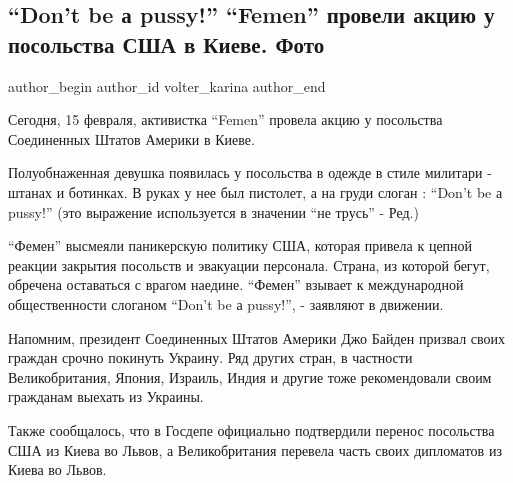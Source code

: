  
 
 
 
 
 
\subsection{\enquote{Don't be а pussy!} \enquote{Femen} провели акцию у посольства США в Киеве. Фото}
\label{sec:15_02_2022.stz.news.ua.strana.2.dont_be_a_pussy_akcia_femen}
 
\ifcmt
 author_begin
   author_id volter_karina
 author_end
\fi

Сегодня, 15 февраля, активистка \enquote{Femen} провела акцию у посольства Соединенных
Штатов Америки в Киеве.

Полуобнаженная девушка появилась у посольства в одежде в стиле милитари -
штанах и ботинках. В руках у нее был пистолет, а на груди слоган : \enquote{Don't be а
pussy!} (это выражение используется в значении \enquote{не трусь} - Ред.)


\enquote{Фемен} высмеяли паникерскую политику США, которая привела к цепной реакции
закрытия посольств и эвакуации персонала. Страна, из которой бегут, обречена
оставаться с врагом наедине. \enquote{Фемен} взывает к международной общественности
слоганом \enquote{Don't be а pussy!}, - заявляют в движении.

Напомним, президент Соединенных Штатов Америки Джо Байден призвал своих граждан
срочно покинуть Украину. Ряд других стран, в частности Великобритания, Япония,
Израиль, Индия и другие тоже рекомендовали своим гражданам выехать из Украины.

Также сообщалось, что в Госдепе официально подтвердили перенос посольства США
из Киева во Львов, а Великобритания перевела часть своих дипломатов из Киева во
Львов.

